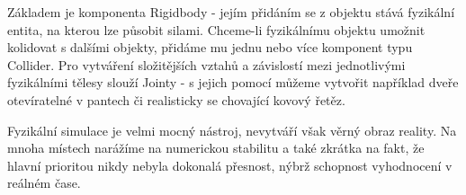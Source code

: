 Základem je komponenta Rigidbody - jejím přidáním se z objektu stává fyzikální entita, na kterou lze působit silami. Chceme-li fyzikálnímu objektu umožnit kolidovat s dalšími objekty, přidáme mu jednu nebo více komponent typu Collider. Pro vytváření složitějších vztahů a závislostí mezi jednotlivými fyzikálními tělesy slouží Jointy - s jejich pomocí můžeme vytvořit například dveře otevíratelné v pantech či realisticky se chovající kovový řetěz.

Fyzikální simulace je velmi mocný nástroj, nevytváří však věrný obraz reality. Na mnoha místech narážíme na numerickou stabilitu a také zkrátka na fakt, že hlavní prioritou nikdy nebyla dokonalá přesnost, nýbrž schopnost vyhodnocení v reálném čase.
